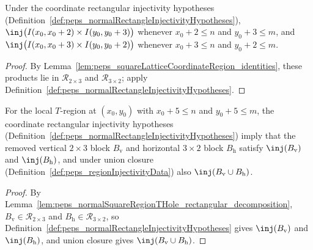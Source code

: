\begin{lemma}%
    \label{lem:peps_squareLatticeRectangleInjectivity_rectangles}
    \leanok
    Under the coordinate rectangular injectivity hypotheses
    (Definition~\ref{def:peps_normalRectangleInjectivityHypotheses}),
    $\inj\bigl(I(x_0,x_0+2)\times I(y_0,y_0+3)\bigr)$ whenever $x_0+2\le n$ and
    $y_0+3\le m$, and $\inj\bigl(I(x_0,x_0+3)\times I(y_0,y_0+2)\bigr)$ whenever
    $x_0+3\le n$ and $y_0+2\le m$.
\end{lemma}
\begin{proof}\leanok
    By Lemma~\ref{lem:peps_squareLatticeCoordinateRegion_identities}, these
    products lie in $\mathcal R_{2\times 3}$ and $\mathcal R_{3\times 2}$; apply
    Definition~\ref{def:peps_normalRectangleInjectivityHypotheses}.
\end{proof}

\begin{lemma}%
    \label{lem:peps_normalSquareRegionT_edgeBlocks_injective}
    \leanok
    For the local $T$-region at $(x_0,y_0)$ with $x_0+5\le n$ and
    $y_0+5\le m$, the coordinate rectangular injectivity hypotheses
    (Definition~\ref{def:peps_normalRectangleInjectivityHypotheses}) imply that
    the removed vertical $2\times 3$ block $B_{\mathrm v}$ and horizontal
    $3\times 2$ block $B_{\mathrm h}$ satisfy $\inj(B_{\mathrm v})$ and
    $\inj(B_{\mathrm h})$, and under union closure
    (Definition~\ref{def:peps_regionInjectivityData}) also
    $\inj(B_{\mathrm v}\cup B_{\mathrm h})$.
\end{lemma}
\begin{proof}\leanok
    By Lemma~\ref{lem:peps_normalSquareRegionTHole_rectangular_decomposition},
    $B_{\mathrm v}\in\mathcal R_{2\times 3}$ and
    $B_{\mathrm h}\in\mathcal R_{3\times 2}$, so
    Definition~\ref{def:peps_normalRectangleInjectivityHypotheses} gives
    $\inj(B_{\mathrm v})$ and $\inj(B_{\mathrm h})$, and union closure gives
    $\inj(B_{\mathrm v}\cup B_{\mathrm h})$.
\end{proof}

